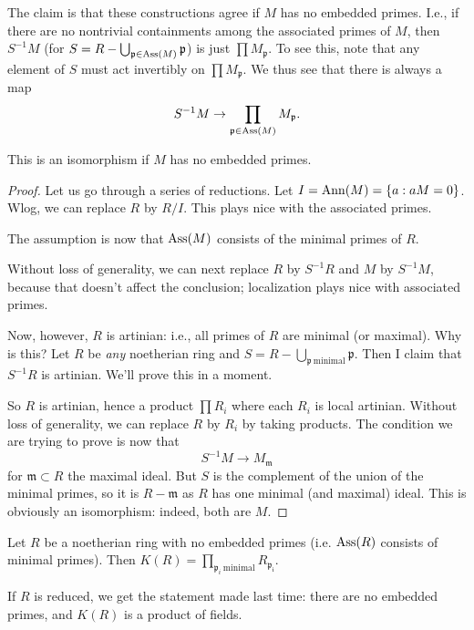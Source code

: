 The claim is that these constructions agree if $M$ has no embedded primes.
I.e., if there are no nontrivial containments among the associated primes of
$M$, then $S^{-1}M$ (for $S =  R - \bigcup_{\mathfrak{p} \in \operatorname{Ass}(M)}
\mathfrak{p}$)
is just $\prod M_{\mathfrak{p}}$.
To see this, note that any element of $S$ must act invertibly on $\prod
M_{\mathfrak{p}}$. We thus see that there is always a map
\[ S^{-1}M \to \prod_{\mathfrak{p} \in \operatorname{Ass}(M)} M_{\mathfrak{p}} . \]
\begin{proposition}
This is an isomorphism if $M$ has no embedded primes.
\end{proposition}

\begin{proof}
Let us go through a series of reductions. Let $I = \operatorname{Ann}(M) = \left\{a: aM
= 0\right\}$. Wlog, we can replace $R $ by $R/I$. This plays nice with the
associated primes.

The assumption is now that $\operatorname{Ass}(M)$ consists of the minimal
primes of $R$.

Without loss of generality, we can next replace $R$ by $S^{-1}R$ and $M$ by
$S^{-1}M$, because that doesn't affect the conclusion; localization plays nice
with associated primes.

Now, however, $R$ is artinian: i.e., all primes of $R$ are minimal (or
maximal). Why is this?
Let $R$ be \emph{any} noetherian ring and $S = R - \bigcup_{\mathfrak{p} \
\mathrm{minimal}} \mathfrak{p}$. Then I claim that $S^{-1}R$ is artinian. We'll
prove this in a moment.

So $R$ is artinian, hence a product $\prod R_i$ where each $R_i$ is local
artinian. Without loss of generality, we can replace $R$ by $R_i$ by taking
products. The condition we are trying to prove is now that
\[ S^{-1}M \to M_{\mathfrak{m}}  \]
for $\mathfrak{m} \subset R$ the maximal ideal. But $S$ is the complement of
the union of the minimal primes, so it is $R - \mathfrak{m}$ as $R$ has one
minimal (and maximal) ideal.  This is obviously an isomorphism: indeed, both
are $M$.
\end{proof}

\begin{corollary}
Let $R$ be a noetherian ring with no embedded primes (i.e. $\operatorname{Ass}(R)$ consists
of minimal primes).
Then $K(R) = \prod_{\mathfrak{p}_i \ \mathrm{minimal}} R_{\mathfrak{p_i}}$.
\end{corollary}
If $R$ is reduced, we get the statement made last time: there are no
embedded primes, and $K(R)$ is a product of
fields.

